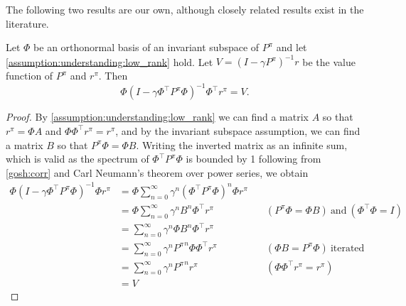 The following two results are our own, although closely related results exist in the literature.

\begin{lemma}\label{lem:lossless_approx}
    Let $\Phi$ be an orthonormal basis of an invariant subspace of $P^\pi$ and let \autoref{assumption:understanding:low_rank} hold. Let $V = (I - \gamma P^\pi)^{-1} r$ be the value function of $P^\pi$ and $r^\pi$. Then $$\Phi (I - \gamma \Phi^\top P^\pi \Phi)^{-1} \Phi^\top r^\pi = V.$$
\end{lemma}
\begin{proof}
    By \autoref{assumption:understanding:low_rank} we can find a matrix $A$ so that $r^\pi = \Phi A$ and $\Phi\Phi^\top r^\pi = r^\pi$, and by the invariant subspace assumption, we can find a matrix $B$ so that $P^\pi \Phi = \Phi B$.
    Writing the inverted matrix as an infinite sum, which is valid as the spectrum of $\Phi^\top P^\pi \Phi$ is bounded by 1 following from \autoref{gosh:corr} and Carl Neumann's theorem over power series, we obtain
    \begin{align*}
        \Phi (I - \gamma \Phi^\top P^\pi \Phi)^{-1} \Phi r^\pi &= \Phi \sum_{n=0}^\infty \gamma^n (\Phi^\top P^\pi \Phi)^n \Phi r^\pi \\
        &= \Phi \sum_{n=0}^\infty \gamma^n B^n \Phi^\top r^\pi &\quad (P^\pi \Phi = \Phi B)~\text{and}~(\Phi^\top \Phi = I)\\
        &= \sum_{n=0}^\infty \gamma^n \Phi B^n \Phi^\top r^\pi \\
        &= \sum_{n=0}^\infty \gamma^n {P^\pi}^n \Phi\Phi^\top r^\pi &\quad (\Phi B = P^\pi \Phi)~\text{iterated} \\
        &= \sum_{n=0}^\infty \gamma^n {P^\pi}^n r^\pi &\quad (\Phi\Phi^\top r^\pi = r^\pi) \\
        &= V
    \end{align*}
\end{proof}

